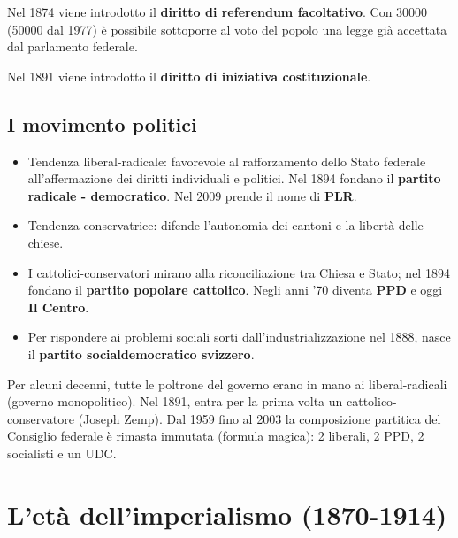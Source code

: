 \documentclass[a4paper]{article}
\begin{document}
Nel 1874 viene introdotto il \textbf{diritto di referendum facoltativo}.
Con 30000 (50000 dal 1977) è possibile sottoporre al voto del popolo una legge già accettata dal parlamento federale.

Nel 1891 viene introdotto il \textbf{diritto di iniziativa costituzionale}.

\subsection{I movimento politici}

\begin{itemize}
    \item Tendenza liberal-radicale: favorevole al rafforzamento dello Stato federale all'affermazione dei diritti individuali e politici.
    Nel 1894 fondano il \textbf{partito radicale - democratico}.
    Nel 2009 prende il nome di \textbf{PLR}.
    \item Tendenza conservatrice: difende l'autonomia dei cantoni e la libertà delle chiese.
    \item I cattolici-conservatori mirano alla riconciliazione tra Chiesa e Stato; nel 1894 fondano il \textbf{partito popolare cattolico}.
    Negli anni '70 diventa \textbf{PPD} e oggi \textbf{Il Centro}.
    \item Per rispondere ai problemi sociali sorti dall'industrializzazione nel 1888, nasce il \textbf{partito socialdemocratico svizzero}.
\end{itemize}

Per alcuni decenni, tutte le poltrone del governo erano in mano ai liberal-radicali (governo monopolitico).
Nel 1891, entra per la prima volta un cattolico-conservatore (Joseph Zemp).
Dal 1959 fino al 2003 la composizione partitica del Consiglio federale è rimasta immutata (formula magica):
2 liberali, 2 PPD, 2 socialisti e un UDC.

\pagebreak

\section{L'età dell'imperialismo (1870-1914)} %


\end{document}

